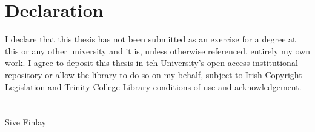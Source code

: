 \chapter*{Declaration}

I declare that this thesis has not been submitted as an exercise for a degree at this or any other university and it is, unless otherwise referenced, entirely my own work. I agree to deposit this thesis in teh University's open access institutional repository or allow the library to do so on my behalf, subject to Irish Copyright Legislation and Trinity College Library conditions of use and acknowledgement.
\\
\\
\\

Sive Finlay